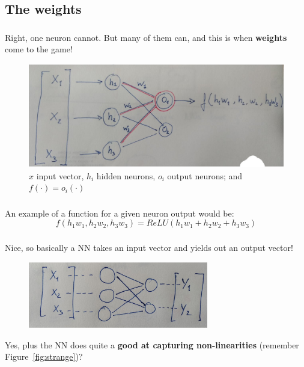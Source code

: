 \documentclass{beamer}
\begin{document}
\subsection{The weights}
\begin{frame}
    \frametitle{\insertsection}
    \framesubtitle{\insertsubsection}

    Right, one neuron cannot. But many of them can, and this is when \textbf{weights} come to the game!
    \begin{figure}
        \centering
        \includegraphics[width=\textwidth]{img/weights.jpg}
        \caption{$x$ input vector, $h_i$ hidden neurons, $o_i$ output neurons; and $f(\cdot)=o_i(\cdot)$}
        \label{fig:weights}
    \end{figure}
\end{frame}


\begin{frame}
    \frametitle{\insertsection}
    \framesubtitle{\insertsubsection}

    An example of a function for a given neuron output would be:
    \begin{equation*}
        f(h_1w_1,h_2w_2,h_3w_3) = ReLU(h_1w_1+h_2w_2+h_3w_3)
    \end{equation*}
\end{frame}



\begin{frame}
    \frametitle{\insertsection}
    \framesubtitle{\insertsubsection}

    Nice, so basically a NN takes an input vector and yields out an output vector!
    \begin{figure}
        \centering
        \includegraphics[width=0.7\textwidth]{img/vector-to-vector.jpg}
        \caption{}
        \label{fig:vector-to-vector}
    \end{figure}

    Yes, plus the NN does quite a \textbf{good at capturing non-linearities} (remember Figure~\ref{fig:strange})?
\end{frame}
\end{document}
